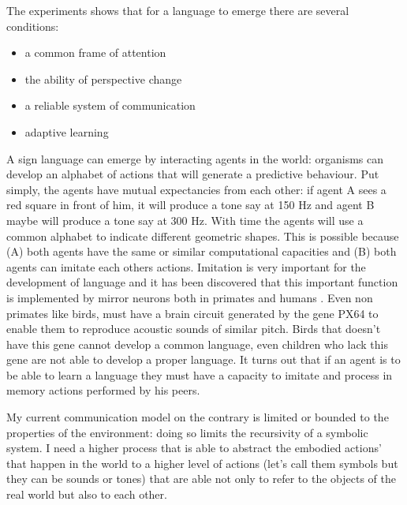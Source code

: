 The experiments shows that for a language to emerge there are several conditions:
\begin{itemize}
 \item a common frame of attention
 \item the ability of perspective change
 \item a reliable system of communication
 \item adaptive learning
\end{itemize}

A sign language can emerge by interacting agents in the world: organisms can develop
an alphabet of actions that will generate a predictive behaviour. Put simply, the agents have mutual 
expectancies from each other: if agent A sees a red square
in front of him, it will produce a tone say at 150 Hz and agent B maybe will produce
a tone say at 300 Hz. With time the agents will use a common alphabet to indicate
different geometric shapes. This is possible because (A) both agents have the same or
similar computational capacities and (B) both agents can imitate each others actions.
Imitation is very important for the development of language and it has been discovered
that this important function is implemented by mirror neurons both in primates and
humans \citep{Buccino200:MirrorNeurons}. Even non primates like birds, must have a brain circuit
generated by the gene PX64 to enable them to reproduce acoustic sounds of similar pitch.
Birds that doesn't have this gene cannot develop a common language, even children who
lack this gene are not able to develop a proper language. It turns out that
if an agent is to be able to learn a language they must have a capacity to imitate and process in memory 
actions performed by his peers.

My current communication model on the contrary is limited or bounded to the properties
of the environment: doing so limits the recursivity of a symbolic system.
I need a higher process that is able to abstract the embodied
actions' that happen in the world to a higher level of actions (let's call them symbols
but they can be sounds or tones) that are able not only to refer to the objects of
the real world but also to each other.

